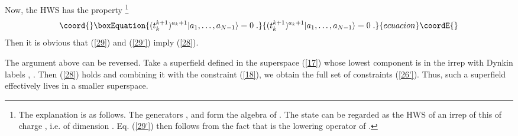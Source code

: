 \documentclass[a4paper,12pt]{article}
\begin{document}
Now, the HWS \coordHE{} has the property 
\footnote{The explanation is as follows. The generators 
\coordHE{}, \coordHE{} and \coordHE{} form the 
algebra of \coordHE{}. The state 
\coordHE{} can be regarded as the HWS of an 
irrep of this \coordHE{} of \coordHE{} charge \coordHE{}, i.e. 
of dimension \coordHE{}. Eq.  (\ref{29'}) then follows from the fact 
that \coordHE{} is the lowering operator of \coordHE{}.} 
\begin{equation}\coord{}\boxEquation{\label{29'}
  (t^{k+1}_k)^{a_k+1}|a_1,\ldots,a_{N-1}\rangle =0\;.
}{(t^{k+1}_k)^{a_k+1}|a_1,\ldots,a_{N-1}\rangle =0\;.
}{ecuacion}\coordE{}\end{equation}
Then it is obvious that (\ref{29}) and (\ref{29'}) imply 
(\ref{28}). 

The argument above can be reversed. Take a superfield defined in 
the superspace \coordHE{} (\ref{17}) whose 
lowest component is in the \coordHE{} irrep with Dynkin labels 
\coordHE{}, \coordHE{}. Then (\ref{28}) holds 
and combining it with the constraint (\ref{18}), we obtain the 
full set of constraints (\ref{26'}). Thus, such a superfield 
effectively lives in a smaller superspace. 
\end{document}
